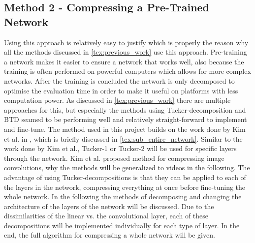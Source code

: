 \subsection{Method 2 - Compressing a Pre-Trained Network}
Using this approach is relatively easy to justify which is properly the reason why all the methods discussed in \autoref{tex:previous_work} use this approach. Pre-training a network makes it easier to ensure a network that works well, also because the training is often performed on powerful computers which allows for more complex networks. After the training is concluded the network is only decomposed to optimise the evaluation time in order to make it useful on platforms with less computation power. As discussed in \autoref{tex:previous_work} there are multiple approaches for this, but especially the methods using Tucker-decomposition and BTD seamed to be performing well and relatively straight-forward to implement and fine-tune.
The method used in this project builds on the work done by Kim et al. in \cite{Kim2016}, which is briefly discussed in \autoref{tex:sub_entire_network}.  Similar to the work done by Kim et al., Tucker-1 or Tucker-2 will be used for specific layers through the network. Kim et al. proposed method for compressing image convolutions, why the methods will be generalized to videos in the following. The advantage of using Tucker-decompositions is that they can be applied to each of the layers in the network, compressing everything at once before fine-tuning the whole network. In the following the methods of decomposing and changing the architecture of the layers of the network will be discussed. Due to the dissimilarities of the linear vs. the convolutional layer, each of these decompositions will be implemented individually for each type of layer. In the end, the full algorithm for compressing a whole network will be given.

